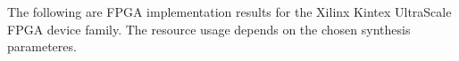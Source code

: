 The following are FPGA implementation results for the Xilinx Kintex UltraScale 
FPGA device family. The resource usage depends on the chosen synthesis
parameteres.


